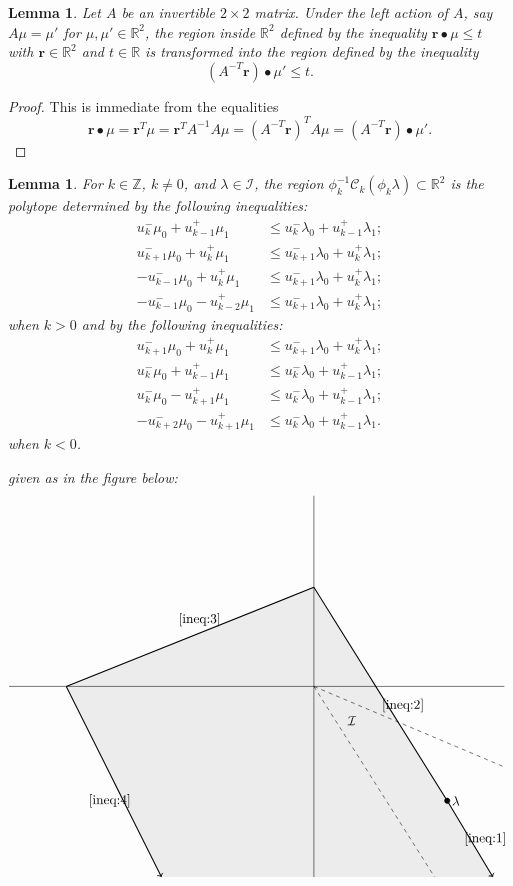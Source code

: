 \documentclass{amsart}
\newtheorem{lemma}[theorem]{Lemma}
\numberwithin{theorem}{section}
\newcommand{\bfr}{\boldsymbol{r}}
\newcommand{\cC}{\mathcal{C}}
\newcommand{\cI}{\mathcal{I}}
\newcommand{\RR}{\mathbb{R}}
\newcommand{\ZZ}{\mathbb{Z}}
\begin{document}
  \begin{lemma}
    \label{le:transformed inequalities}
    Let $A$ be an invertible $2\times 2$ matrix.
    Under the left action of $A$, say $A\mu=\mu'$ for $\mu,\mu'\in\RR^2$, the region inside $\RR^2$ defined by the inequality $\bfr\bullet\mu \le t$ with $\bfr\in\RR^2$ and $t\in\RR$ is transformed into the region defined by the inequality \[(A^{-T}\bfr)\bullet\mu'\le t.\]
  \end{lemma}
  \begin{proof}
    This is immediate from the equalities
    \[\bfr\bullet\mu=\bfr^T\mu=\bfr^TA^{-1}A\mu=(A^{-T}\bfr)^TA\mu=(A^{-T}\bfr)\bullet\mu'.\]
  \end{proof}
  
  \begin{lemma}
    \label{le:dominance inequalities}
    For $k\in\ZZ$, $k\ne0$, and $\lambda\in\cI$, the region $\phi_k^{-1}\cC_k(\phi_k\lambda)\subset\RR^2$ is the polytope determined by the following inequalities:
    \begin{align}
      \label{ineq:1} u_k^-\mu_0+u_{k-1}^+\mu_1 &\le u_k^-\lambda_0+u_{k-1}^+\lambda_1;\\
      \label{ineq:2} u_{k+1}^-\mu_0+u_k^+\mu_1 &\le u_{k+1}^-\lambda_0+u_k^+\lambda_1;\\
      \label{ineq:3} -u_{k-1}^-\mu_0+u_k^+\mu_1 &\le u_{k+1}^-\lambda_0+u_k^+\lambda_1;\\
      \label{ineq:4} -u_{k-1}^-\mu_0-u_{k-2}^+\mu_1 &\le u_{k+1}^-\lambda_0+u_k^+\lambda_1;
    \end{align}
    when $k>0$ and by the following inequalities:
    \begin{align*}
      u_{k+1}^-\mu_0+u_k^+\mu_1 &\le u_{k+1}^-\lambda_0+u_k^+\lambda_1;\\
      u_k^-\mu_0+u_{k-1}^+\mu_1 &\le u_k^-\lambda_0+u_{k-1}^+\lambda_1;\\
      u_k^-\mu_0-u_{k+1}^+\mu_1 &\le u_k^-\lambda_0+u_{k-1}^+\lambda_1;\\
      -u_{k+2}^-\mu_0-u_{k+1}^+\mu_1 &\le u_k^-\lambda_0+u_{k-1}^+\lambda_1.
    \end{align*}
    when $k<0$.
    
    given as in the figure below:
    \[
      \begin{tikzpicture}
        \filldraw[color=lightgray!30] (47/10,-5) --(3.5,-3) -- (0,26/10) -- (-26/4,0) -- (-16/4,-5);
        \draw[-] (-8,0) -- (5,0);
        \draw[-] (0,-5) -- (0,5);
        \draw[dashed] (0,0) -- (5,-2.113);
        \draw[dashed] (0,0) -- (3.17,-5);
        \node at (1,-0.9) {$\cI$};
        \draw[fill=black] (3.5,-3) circle (2pt);
        \node[right] at (3.5,-3) {$\lambda$};
        \draw[->,thick] (3.5,-3) -- (47/10,-5);
        \draw[-,thick] (3.5,-3) -- (0,26/10);
        \draw[-,thick] (0,26/10) -- (-26/4,0);
        \draw[->,thick] (-26/4,0) -- (-16/4,-5);
        \node at (4.5,-4) {\eqref{ineq:1}};
        \node at (2.34,-0.5) {\eqref{ineq:2}};
        \node at (-3,1.75) {\eqref{ineq:3}};
        \node at (-5.36,-3) {\eqref{ineq:4}};
      \end{tikzpicture}
    \]
  \end{lemma}
\end{document}
